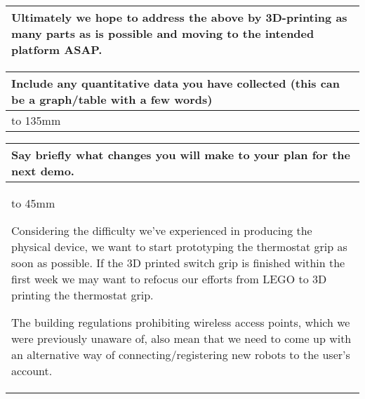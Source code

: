 \documentclass[a4paper]{article}
\newcommand{\colWidth}{141mm}
\begin{document}
\begin{center}
\begin{tabular}{|p{\colWidth}|}
{		\vspace{2.5mm}

		Ultimately we hope to address the above by 3D-printing as many parts as is possible and moving to the intended platform ASAP.
  }
  \\
  \hline
\end{tabular}
\vskip 5mm


\begin{tabular}{|p{\colWidth}|}
	\hline
	\cellcolor{blue!25}\large
	\textbf{Include any quantitative data you have collected (this can be a graph/table with a few words)}
	\\ \hline
	\vtop to 135mm{
  }
  \\
  \hline
\end{tabular}
\vskip 5mm


\begin{tabular}{|p{\colWidth}|}
	\hline
	\cellcolor{blue!25}\large
	\textbf{Say briefly what changes you will make to your plan for the next demo.}
	\\ \hline
	\vtop to 45mm{
		Considering the difficulty we've experienced in producing the physical device, we want to start prototyping the thermostat grip as soon as possible. If the 3D printed switch grip is finished within the first week we may want to refocus our efforts from LEGO to 3D printing the thermostat grip.

		\vspace{2.5mm}

		The building regulations prohibiting wireless access points, which we were previously unaware of, also mean that we need to come up with an alternative way of connecting/registering new robots to the user's account.
  	}
  \\
  \hline
\end{tabular}

\end{center}
  
\end{document}
